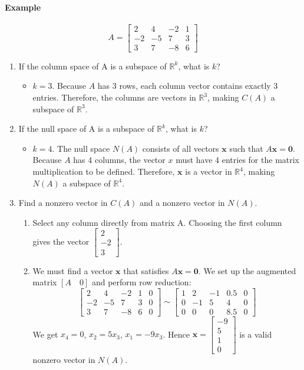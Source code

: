 \documentclass[../linear-algebra.tex]{subfiles}
\begin{document}
\paragraph{Example}
\[A = \begin{bmatrix} 2 & 4 & -2 & 1 \\ -2 & -5 & 7 & 3 \\ 3 & 7 & -8 & 6 \end{bmatrix}\]
\begin{enumerate}
    \item If the column space of A is a subspace of $\mathbb{R}^k$, what is $k$?
    \begin{itemize}
        \item $k = 3$. Because $A$ has 3 rows, each column vector contains exactly 3 entries. Therefore, the columns are vectors in $\mathbb{R}^3$, making $C(A)$ a subspace of $\mathbb{R}^3$.
    \end{itemize}
    
    \item If the null space of A is a subspace of $\mathbb{R}^k$, what is $k$?
    \begin{itemize}
        \item $k = 4$. The null space $N(A)$ consists of all vectors $\mathbf{x}$ such that $A\mathbf{x} = \mathbf{0}$. Because $A$ has 4 columns, the vector $x$ must have 4 entries for the matrix multiplication to be defined. Therefore, $\mathbf{x}$ is a vector in $\mathbb{R}^4$, making $N(A)$ a subspace of $\mathbb{R}^4$.
    \end{itemize}

    \item Find a nonzero vector in $C(A)$ and a nonzero vector in $N(A)$.
    \begin{enumerate}
        \item Select any column directly from matrix A. Choosing the first column gives the vector $\begin{bmatrix} 2 \\ -2 \\ 3 \end{bmatrix}$.
        \item We must find a vector $\mathbf{x}$ that satisfies $A\mathbf{x} = \mathbf{0}$. We set up the augmented matrix $[A \quad 0]$ and perform row reduction:
        \[\begin{bmatrix} 2 & 4 & -2 & 1 & 0 \\ -2 & -5 & 7 & 3 & 0 \\ 3 & 7 & -8 & 6 & 0 \end{bmatrix} \sim \begin{bmatrix} 1 & 2 & -1 & 0.5 & 0 \\ 0 & -1 & 5 & 4 & 0 \\ 0 & 0 & 0 & 8.5 & 0 \end{bmatrix}\]
        We get $x_4 = 0$, $x_2 = 5x_3$, $x_1 = -9x_3$. Hence $\mathbf{x} = \begin{bmatrix} -9 \\ 5 \\ 1 \\ 0 \end{bmatrix}$ is a valid nonzero vector in $N(A)$.
    \end{enumerate}


\end{enumerate}
\end{document}

